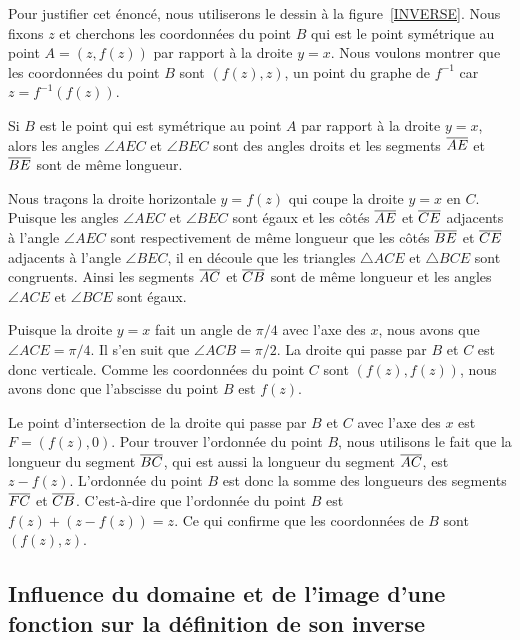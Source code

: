 { 

\begin{rmk}[\theory]
Pour justifier cet énoncé, nous utiliserons le dessin à la
figure~\ref{INVERSE}.
Nous fixons $z$ et cherchons les coordonnées du point $B$ qui est
le point symétrique au point $A = (z,f(z))$ par rapport à la droite
$y=x$.  Nous voulons montrer que les coordonnées du point $B$ sont
$(f(z),z)$, un point du graphe de $f^{-1}$ car $z = f^{-1}(f(z))$.

Si $B$ est le point qui est symétrique au point $A$ par rapport à la
droite $y=x$, alors les angles $\angle AEC$ et $\angle BEC$ sont des
angles droits et les segments $\overline{AE}$ et $\overline{BE}$ sont de même
longueur.

Nous traçons la droite horizontale $y = f(z)$ qui coupe la droite $y=x$ en
$C$.  Puisque les angles $\angle AEC$ et $\angle BEC$ sont égaux et les
côtés $\overline{AE}$ et $\overline{CE}$ adjacents à l'angle $\angle AEC$ sont
respectivement de même longueur que les côtés $\overline{BE}$ et $\overline{CE}$
adjacents à l'angle $\angle BEC$, il en découle que les triangles
$\triangle ACE$ et $\triangle BCE$ sont congruents.  Ainsi les
segments $\overline{AC}$ et $\overline{CB}$ sont de même longueur et les angles
$\angle ACE$ et $\angle BCE$ sont égaux.

Puisque la droite $y=x$ fait un angle de $\pi/4$ avec l'axe des $x$,
nous avons que $\angle ACE = \pi/4$.  Il s'en suit que $\angle ACB = \pi/2$.
La droite qui passe par $B$ et $C$ est donc verticale.  Comme les
coordonnées du point $C$ sont $(f(z),f(z))$, nous avons donc que
l'abscisse du point $B$ est $f(z)$.

Le point d'intersection de la droite qui passe par $B$ et $C$ avec
l'axe des $x$ est $F=(f(z),0)$.  Pour trouver l'ordonnée du point $B$,
nous utilisons le fait que la longueur du segment $\overline{BC}$, qui est
aussi la longueur du segment $\overline{AC}$, est $z-f(z)$.
L'ordonnée du point $B$ est donc la somme des longueurs des segments
$\overline{FC}$ et $\overline{CB}$.  C'est-à-dire que l'ordonnée du point $B$
est $f(z) + (z - f(z)) = z$.  Ce qui confirme que les coordonnées de
$B$ sont $(f(z),z)$.
\end{rmk}

\subsection[Influence du domaine et de l'image]{Influence du domaine
  et de l'image d'une fonction sur la définition de son inverse}

}
